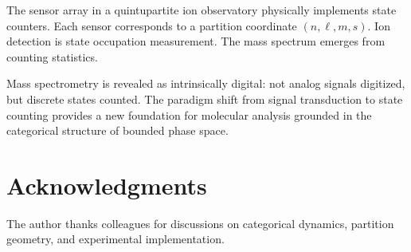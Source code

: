 \documentclass[twocolumn,10pt]{article}
\begin{document}
The sensor array in a quintupartite ion observatory physically implements state counters. Each sensor corresponds to a partition coordinate $(n, \ell, m, s)$. Ion detection is state occupation measurement. The mass spectrum emerges from counting statistics.

Mass spectrometry is revealed as intrinsically digital: not analog signals digitized, but discrete states counted. The paradigm shift from signal transduction to state counting provides a new foundation for molecular analysis grounded in the categorical structure of bounded phase space.

\section*{Acknowledgments}

The author thanks colleagues for discussions on categorical dynamics, partition geometry, and experimental implementation.



\end{document}
